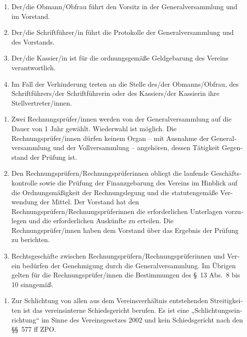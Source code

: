 \begin{otherlanguage}{german}
\begin{enumerate}[statutenenum]
    \item Der/die Obmann/Obfrau führt den Vorsitz in der Generalversammlung und im Vorstand.

    \item Der/die Schriftführer/in führt die Protokolle der Generalversammlung und des Vorstands.

    \item Der/die Kassier/in ist für die ordnungsgemäße Geldgebarung des Vereins verantwortlich.

    \item Im Fall der Verhinderung treten an die Stelle des/der Obmanns/Obfrau, des Schriftführers/der Schriftführerin oder des Kassiers/der Kassierin ihre Stellvertreter/innen.
\end{enumerate}


\begin{enumerate}[statutenenum]
    \item Zwei Rechnungsprüfer/innen werden von der Generalversammlung auf die Dauer von 1 Jahr gewählt.
        Wiederwahl ist möglich.
        Die Rechnungsprüfer/innen dürfen keinem Organ -- mit Ausnahme der Generalversammlung und der Vollversammlung -- angehören, dessen Tätigkeit Gegenstand der Prüfung ist.

    \item Den Rechnungsprüfern/Rechnungsprüferinnen obliegt die laufende Geschäftskontrolle sowie die Prüfung der Finanzgebarung des Vereins im Hinblick auf die Ordnungsmäßigkeit der Rechnungslegung und die statutengemäße Verwendung der Mittel.
        Der Vorstand hat den Rechnungsprüfern/Rechnungsprüferinnen die erforderlichen Unterlagen vorzulegen und die erforderlichen Auskünfte zu erteilen.
        Die Rechnungsprüfer/innen haben dem Vorstand über das Ergebnis der Prüfung zu berichten.

    \item Rechtsgeschäfte zwischen Rechnungsprüfern/Rechnungsprüferinnen und Verein bedürfen der Genehmigung durch die Generalversammlung.
        Im Übrigen gelten für die Rechnungsprüfer/innen die Bestimmungen des \S\ 13 Abs.\ 8 bis 10 sinngemäß.
\end{enumerate}


\begin{enumerate}[statutenenum]
    \item Zur Schlichtung von allen aus dem Vereinsverhältnis entstehenden Streitigkeiten ist das vereinsinterne Schiedsgericht berufen.
        Es ist eine „Schlichtungseinrichtung“ im Sinne des Vereinsgesetzes 2002 und kein Schiedsgericht nach den \S\S\ 577 ff ZPO.


\end{enumerate}
\end{otherlanguage}
